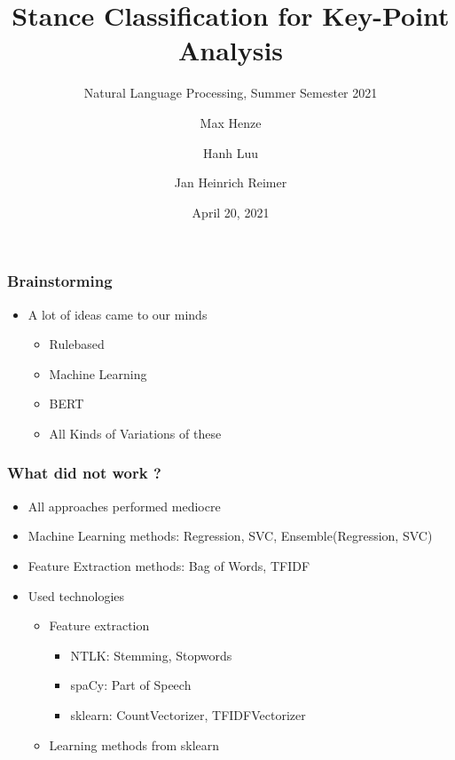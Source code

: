 \documentclass[english,handout]{mlutalk}
\title{Stance Classification for Key-Point Analysis}
\subtitle{Natural Language Processing, Summer Semester 2021}
\author{Max Henze \and Hanh Luu \and Jan Heinrich Reimer}
\institute{Martin Luther University Halle-Wittenberg}
\date{April 20, 2021}
\begin{document}
\titleframe

\begin{frame}
  \frametitle{Brainstorming}

  \begin{itemize}
    \item A lot of ideas came to our minds
    \begin{itemize}
      \item Rulebased
      \item Machine Learning
      \item BERT
      \item All Kinds of Variations of these
    \end{itemize}   
  \end{itemize}

\end{frame}

\begin{frame}
  \frametitle{What did not work ?}
    \begin{itemize}
      \item All approaches performed mediocre
      \item Machine Learning methods: Regression, SVC, Ensemble(Regression, SVC)
      \item Feature Extraction methods: Bag of Words, TFIDF
      \item Used technologies
      		\begin{itemize}
    		\item Feature extraction
    		\begin{itemize}
    			\item NTLK: Stemming, Stopwords
    			\item spaCy: Part of Speech
    			\item sklearn: CountVectorizer, TFIDFVectorizer
    		\end{itemize}
    		\item Learning methods from sklearn
    	\end{itemize}
    \end{itemize}
  

\end{frame}
\end{document}
